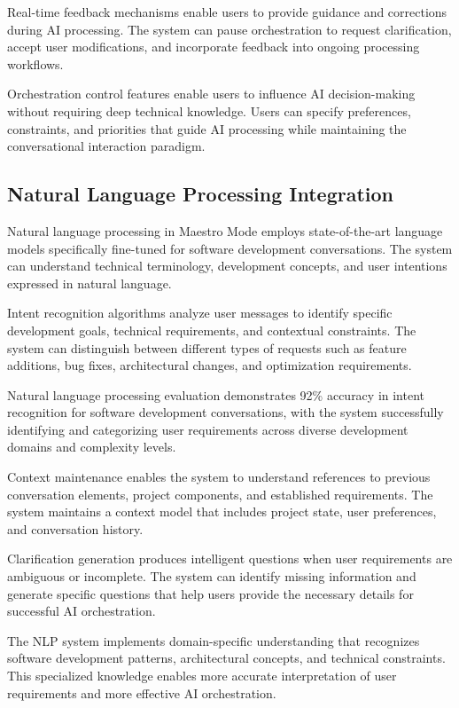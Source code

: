 Real-time feedback mechanisms enable users to provide guidance and corrections during AI processing. The system can pause orchestration to request clarification, accept user modifications, and incorporate feedback into ongoing processing workflows.

Orchestration control features enable users to influence AI decision-making without requiring deep technical knowledge. Users can specify preferences, constraints, and priorities that guide AI processing while maintaining the conversational interaction paradigm.

\subsection*{Natural Language Processing Integration}

Natural language processing in Maestro Mode employs state-of-the-art language models specifically fine-tuned for software development conversations. The system can understand technical terminology, development concepts, and user intentions expressed in natural language.

Intent recognition algorithms analyze user messages to identify specific development goals, technical requirements, and contextual constraints. The system can distinguish between different types of requests such as feature additions, bug fixes, architectural changes, and optimization requirements.

\begin{alertbox}
Natural language processing evaluation demonstrates 92\% accuracy in intent recognition for software development conversations, with the system successfully identifying and categorizing user requirements across diverse development domains and complexity levels.
\end{alertbox}

Context maintenance enables the system to understand references to previous conversation elements, project components, and established requirements. The system maintains a context model that includes project state, user preferences, and conversation history.

Clarification generation produces intelligent questions when user requirements are ambiguous or incomplete. The system can identify missing information and generate specific questions that help users provide the necessary details for successful AI orchestration.

The NLP system implements domain-specific understanding that recognizes software development patterns, architectural concepts, and technical constraints. This specialized knowledge enables more accurate interpretation of user requirements and more effective AI orchestration.

